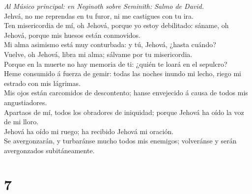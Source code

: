  \emph{Al Músico principal: en Neginoth sobre Seminith:
Salmo de David.}\\
Jehvá, no me reprendas en tu furor, ni me castigues con tu ira.\\
 Ten misericordia de mí, oh Jehová, porque yo estoy
debilitado: sáname, oh Jehová, porque mis huesos están conmovidos.\\
 Mi alma asimismo está muy conturbada: y tú, Jehová, ¿hasta
cuándo?\\
 Vuelve, oh Jehová, libra mi alma; sálvame por tu
misericordia.\\
 Porque en la muerte no hay memoria de ti: ¿quién te loará
en el sepulcro?\\
 Heme consumido á fuerza de gemir: todas las noches inundo
mi lecho, riego mi estrado con mis lágrimas.\\
 Mis ojos están carcomidos de descontento; hanse envejecido
á causa de todos mis angustiadores.\\
 Apartaos de mí, todos los obradores de iniquidad; porque
Jehová ha oído la voz de mi lloro.\\
 Jehová ha oído mi ruego; ha recibido Jehová mi oración.\\
 Se avergonzarán, y turbaránse mucho todos mis enemigos;
volveránse y serán avergonzados subitáneamente.

\hypertarget{section-6}{%
\section{7}\label{section-6}}

